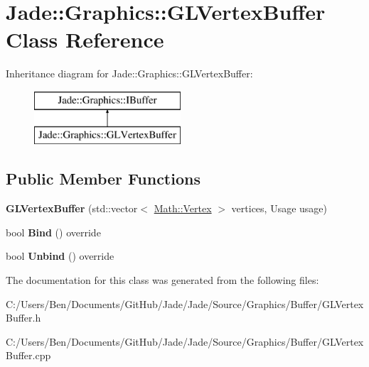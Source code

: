 \hypertarget{class_jade_1_1_graphics_1_1_g_l_vertex_buffer}{}\section{Jade\+:\+:Graphics\+:\+:G\+L\+Vertex\+Buffer Class Reference}
\label{class_jade_1_1_graphics_1_1_g_l_vertex_buffer}
Inheritance diagram for Jade\+:\+:Graphics\+:\+:G\+L\+Vertex\+Buffer\+:\begin{figure}[H]
\begin{center}
\leavevmode
\includegraphics[height=2.000000cm]{class_jade_1_1_graphics_1_1_g_l_vertex_buffer}
\end{center}
\end{figure}
\subsection*{Public Member Functions}
\begin{DoxyCompactItemize}
\item 
\hypertarget{class_jade_1_1_graphics_1_1_g_l_vertex_buffer_a2e09acdc7cdcd33abfd39bf94299d72f}{}{\bfseries G\+L\+Vertex\+Buffer} (std\+::vector$<$ \hyperlink{struct_jade_1_1_math_1_1_vertex}{Math\+::\+Vertex} $>$ vertices, Usage usage)\label{class_jade_1_1_graphics_1_1_g_l_vertex_buffer_a2e09acdc7cdcd33abfd39bf94299d72f}

\item 
\hypertarget{class_jade_1_1_graphics_1_1_g_l_vertex_buffer_a6aabae05eb1154cf288efdea472b36b6}{}bool {\bfseries Bind} () override\label{class_jade_1_1_graphics_1_1_g_l_vertex_buffer_a6aabae05eb1154cf288efdea472b36b6}

\item 
\hypertarget{class_jade_1_1_graphics_1_1_g_l_vertex_buffer_ab6f6a4a8d41aa55c425d5e33a91c46e0}{}bool {\bfseries Unbind} () override\label{class_jade_1_1_graphics_1_1_g_l_vertex_buffer_ab6f6a4a8d41aa55c425d5e33a91c46e0}

\end{DoxyCompactItemize}


The documentation for this class was generated from the following files\+:\begin{DoxyCompactItemize}
\item 
C\+:/\+Users/\+Ben/\+Documents/\+Git\+Hub/\+Jade/\+Jade/\+Source/\+Graphics/\+Buffer/G\+L\+Vertex\+Buffer.\+h\item 
C\+:/\+Users/\+Ben/\+Documents/\+Git\+Hub/\+Jade/\+Jade/\+Source/\+Graphics/\+Buffer/G\+L\+Vertex\+Buffer.\+cpp\end{DoxyCompactItemize}
